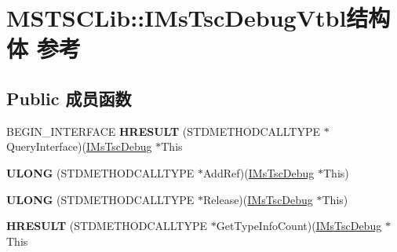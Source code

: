 \hypertarget{struct_m_s_t_s_c_lib_1_1_i_ms_tsc_debug_vtbl}{}\section{M\+S\+T\+S\+C\+Lib\+:\+:I\+Ms\+Tsc\+Debug\+Vtbl结构体 参考}
\label{struct_m_s_t_s_c_lib_1_1_i_ms_tsc_debug_vtbl}
\subsection*{Public 成员函数}
\begin{DoxyCompactItemize}
\item 
\mbox{\label{struct_m_s_t_s_c_lib_1_1_i_ms_tsc_debug_vtbl_a7244a226e6876753b04209155adf5442}} 
B\+E\+G\+I\+N\+\_\+\+I\+N\+T\+E\+R\+F\+A\+CE {\bfseries H\+R\+E\+S\+U\+LT} (S\+T\+D\+M\+E\+T\+H\+O\+D\+C\+A\+L\+L\+T\+Y\+PE $\ast$Query\+Interface)(\hyperlink{interface_m_s_t_s_c_lib_1_1_i_ms_tsc_debug}{I\+Ms\+Tsc\+Debug} $\ast$This
\item 
\mbox{\label{struct_m_s_t_s_c_lib_1_1_i_ms_tsc_debug_vtbl_ad474d800674f0f64b991847c2e069e9e}} 
{\bfseries U\+L\+O\+NG} (S\+T\+D\+M\+E\+T\+H\+O\+D\+C\+A\+L\+L\+T\+Y\+PE $\ast$Add\+Ref)(\hyperlink{interface_m_s_t_s_c_lib_1_1_i_ms_tsc_debug}{I\+Ms\+Tsc\+Debug} $\ast$This)
\item 
\mbox{\label{struct_m_s_t_s_c_lib_1_1_i_ms_tsc_debug_vtbl_ae6d926aa1d853a9f99757e114e6710b0}} 
{\bfseries U\+L\+O\+NG} (S\+T\+D\+M\+E\+T\+H\+O\+D\+C\+A\+L\+L\+T\+Y\+PE $\ast$Release)(\hyperlink{interface_m_s_t_s_c_lib_1_1_i_ms_tsc_debug}{I\+Ms\+Tsc\+Debug} $\ast$This)
\item 
\mbox{\label{struct_m_s_t_s_c_lib_1_1_i_ms_tsc_debug_vtbl_ae3f7ae9cbd6118e3f513fdda31e87a73}} 
{\bfseries H\+R\+E\+S\+U\+LT} (S\+T\+D\+M\+E\+T\+H\+O\+D\+C\+A\+L\+L\+T\+Y\+PE $\ast$Get\+Type\+Info\+Count)(\hyperlink{interface_m_s_t_s_c_lib_1_1_i_ms_tsc_debug}{I\+Ms\+Tsc\+Debug} $\ast$This
\item 
\mbox{\label{struct_m_s_t_s_c_lib_1_1_i_ms_tsc_debug_vtbl_a8eefe6b3acb6608aabd5554d8d0c98f4}} 

\end{DoxyCompactItemize}
